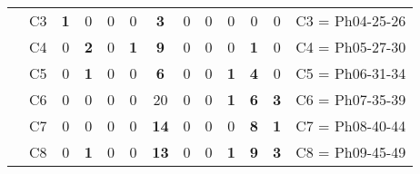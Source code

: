 \begin{table}[H]
{\begin{tabular}{|ccrrrrrrrrrrc|}
\multicolumn{1}{|c|}{}                                      & \multicolumn{1}{c|}{C3} & \multicolumn{1}{c|}{\textbf{1}}  & \multicolumn{1}{c|}{0}  & \multicolumn{1}{c|}{0}  & \multicolumn{1}{c|}{0}  & \multicolumn{1}{c|}{\textbf{3}}  & \multicolumn{1}{c|}{0}  & \multicolumn{1}{c|}{0}  & \multicolumn{1}{c|}{0}  & \multicolumn{1}{c|}{0}  & \multicolumn{1}{c|}{0}  & C3 = Ph04-25-26   \\ \cline{2-13}
\multicolumn{1}{|c|}{}                                      & \multicolumn{1}{c|}{C4} & \multicolumn{1}{c|}{0}  & \multicolumn{1}{c|}{\textbf{2}}  & \multicolumn{1}{c|}{0}  & \multicolumn{1}{c|}{\textbf{1}}  & \multicolumn{1}{c|}{\textbf{9}}  & \multicolumn{1}{c|}{0}  & \multicolumn{1}{c|}{0}  & \multicolumn{1}{c|}{0}  & \multicolumn{1}{c|}{\textbf{1}}  & \multicolumn{1}{c|}{0}  & C4 = Ph05-27-30   \\ \cline{2-13}
\multicolumn{1}{|c|}{}                                      & \multicolumn{1}{c|}{C5} & \multicolumn{1}{c|}{0}  & \multicolumn{1}{c|}{\textbf{1}}  & \multicolumn{1}{c|}{0}  & \multicolumn{1}{c|}{0}  & \multicolumn{1}{c|}{\textbf{6}}  & \multicolumn{1}{c|}{0}  & \multicolumn{1}{c|}{0}  & \multicolumn{1}{c|}{\textbf{1}}  & \multicolumn{1}{c|}{\textbf{4}}  & \multicolumn{1}{c|}{0}  & C5 = Ph06-31-34   \\ \cline{2-13}
\multicolumn{1}{|c|}{}                                      & \multicolumn{1}{c|}{C6} & \multicolumn{1}{c|}{0}  & \multicolumn{1}{c|}{0}  & \multicolumn{1}{c|}{0}  & \multicolumn{1}{c|}{0}  & \multicolumn{1}{c|}{20} & \multicolumn{1}{c|}{0}  & \multicolumn{1}{c|}{0}  & \multicolumn{1}{c|}{\textbf{1}}  & \multicolumn{1}{c|}{\textbf{6}}  & \multicolumn{1}{c|}{\textbf{3}}  & C6 = Ph07-35-39   \\ \cline{2-13}
\multicolumn{1}{|c|}{}                                      & \multicolumn{1}{c|}{C7} & \multicolumn{1}{c|}{0}  & \multicolumn{1}{c|}{0}  & \multicolumn{1}{c|}{0}  & \multicolumn{1}{c|}{0}  & \multicolumn{1}{c|}{\textbf{14}} & \multicolumn{1}{c|}{0}  & \multicolumn{1}{c|}{0}  & \multicolumn{1}{c|}{0}  & \multicolumn{1}{c|}{\textbf{8}}  & \multicolumn{1}{c|}{\textbf{1}}  & C7 = Ph08-40-44   \\ \cline{2-13}
\multicolumn{1}{|c|}{}                                      & \multicolumn{1}{c|}{C8} & \multicolumn{1}{c|}{0}  & \multicolumn{1}{c|}{\textbf{1}}  & \multicolumn{1}{c|}{0}  & \multicolumn{1}{c|}{0}  & \multicolumn{1}{c|}{\textbf{13}} & \multicolumn{1}{c|}{0}  & \multicolumn{1}{c|}{0}  & \multicolumn{1}{c|}{\textbf{1}}  & \multicolumn{1}{c|}{\textbf{9}}  & \multicolumn{1}{c|}{\textbf{3}}  & C8 = Ph09-45-49   \\ \cline{2-13}

\end{tabular}}
\end{table}

